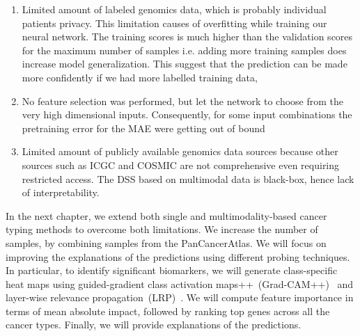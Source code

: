 \begin{enumerate}[noitemsep]
    \item Limited amount of labeled genomics data, which is probably individual patients privacy. This limitation causes of overfitting while training our neural network. The training scores is much higher than the validation scores for the maximum number of samples i.e. adding more training samples does increase model generalization. This suggest that the prediction can be made more confidently if we had more labelled training data, 

    \item No feature selection was performed, but let the network to choose from the very high dimensional inputs. Consequently, for some input combinations the pretraining error for the MAE were getting out of bound

    \item Limited amount of publicly available genomics data sources because other sources such as ICGC and COSMIC are not comprehensive even requiring restricted access. The DSS based on multimodal data is black-box, hence lack of interpretability. 
\end{enumerate}



\hspace*{3.5mm} In the next chapter, we extend both single and multimodality-based cancer typing methods to overcome both limitations. We increase the number of samples, by combining samples from the PanCancerAtlas. We will focus on improving the explanations of the predictions using different probing techniques.
In particular, to identify significant biomarkers, we will generate class-specific heat maps using guided-gradient class activation maps++~(Grad-CAM++)~\cite{chattopadhay2018grad} and layer-wise relevance propagation~(LRP)~\cite{LRP3}. We will compute feature importance in terms of mean absolute impact, followed by ranking top genes across all the cancer types. Finally, we will provide explanations of the predictions.  

